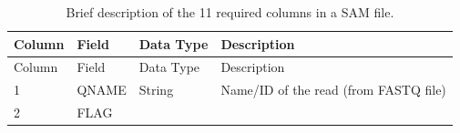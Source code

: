 \documentclass[]{krantz}
\begin{document}
\begin{longtable}[]{@{}llll@{}}
\caption{\label{tab:sam-cols} Brief description of the 11 required columns in a SAM file.}\tabularnewline
\toprule
\begin{minipage}[b]{0.11\columnwidth}\raggedright
Column\strut
\end{minipage} & \begin{minipage}[b]{0.10\columnwidth}\raggedright
Field\strut
\end{minipage} & \begin{minipage}[b]{0.15\columnwidth}\raggedright
Data Type\strut
\end{minipage} & \begin{minipage}[b]{0.41\columnwidth}\raggedright
Description\strut
\end{minipage}\tabularnewline
\midrule
\endfirsthead
\toprule
\begin{minipage}[b]{0.11\columnwidth}\raggedright
Column\strut
\end{minipage} & \begin{minipage}[b]{0.10\columnwidth}\raggedright
Field\strut
\end{minipage} & \begin{minipage}[b]{0.15\columnwidth}\raggedright
Data Type\strut
\end{minipage} & \begin{minipage}[b]{0.41\columnwidth}\raggedright
Description\strut
\end{minipage}\tabularnewline
\midrule
\endhead
\begin{minipage}[t]{0.11\columnwidth}\raggedright
1\strut
\end{minipage} & \begin{minipage}[t]{0.10\columnwidth}\raggedright
QNAME\strut
\end{minipage} & \begin{minipage}[t]{0.15\columnwidth}\raggedright
String\strut
\end{minipage} & \begin{minipage}[t]{0.41\columnwidth}\raggedright
Name/ID of the read (from
FASTQ file)\strut
\end{minipage}\tabularnewline
\begin{minipage}[t]{0.11\columnwidth}\raggedright
2\strut
\end{minipage} & \begin{minipage}[t]{0.10\columnwidth}\raggedright
FLAG\strut
\end{minipage} & \begin{minipage}[t]{0.15\columnwidth}\raggedright

\end{minipage}
\end{longtable}
\end{document}
